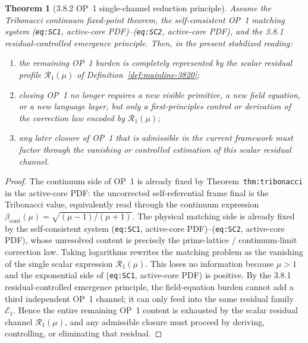 \documentclass[12pt,a4paper]{article}
\newtheorem{theorem}{Theorem}[section]
\begin{document}
\begin{theorem}[3.8.2 OP~1 single-channel reduction principle]
\label{thm:mainline-3820}
Assume the Tribonacci continuum fixed-point theorem, the self-consistent OP~1 matching system (\texttt{eq:SC1}, active-core PDF)--(\texttt{eq:SC2}, active-core PDF), and the 3.8.1 residual-controlled emergence principle. Then, in the present stabilized reading:
\begin{enumerate}[label=(\roman*), leftmargin=2em]
 \item the remaining OP~1 burden is completely represented by the scalar residual profile \(\mathcal R_{1}(\mu)\) of Definition~\ref{def:mainline-3820};
 \item closing OP~1 no longer requires a new visible primitive, a new field equation, or a new language layer, but only a first-principles control or derivation of the correction law encoded by \(\mathcal R_{1}(\mu)\);
 \item any later closure of OP~1 that is admissible in the current framework must factor through the vanishing or controlled estimation of this scalar residual channel.
\end{enumerate}
\end{theorem}

\begin{proof}
The continuum side of OP~1 is already fixed by Theorem~\texttt{thm:tribonacci} in the active-core PDF: the uncorrected self-referential frame final is the Tribonacci value, equivalently read through the continuum expression \(\beta_{\mathrm{cont}}(\mu)=\sqrt{(\mu-1)/(\mu+1)}\). The physical matching side is already fixed by the self-consistent system (\texttt{eq:SC1}, active-core PDF)--(\texttt{eq:SC2}, active-core PDF), whose unresolved content is precisely the prime-lattice / continuum-limit correction law. Taking logarithms rewrites the matching problem as the vanishing of the single scalar expression \(\mathcal R_{1}(\mu)\). This loses no information because \(\mu>1\) and the exponential side of (\texttt{eq:SC1}, active-core PDF) is positive. By the 3.8.1 residual-controlled emergence principle, the field-equation burden cannot add a third independent OP~1 channel; it can only feed into the same residual family \(\mathcal E_{1}\). Hence the entire remaining OP~1 content is exhausted by the scalar residual channel \(\mathcal R_{1}(\mu)\), and any admissible closure must proceed by deriving, controlling, or eliminating that residual.
\end{proof}
\end{document}
